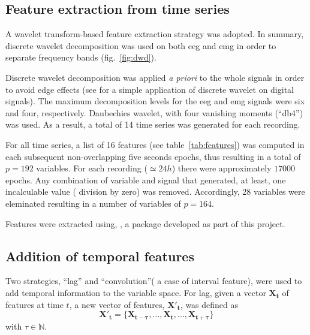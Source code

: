 \subsection{Feature extraction from time series}
\label{sub:features}

A wavelet transform-based feature extraction strategy was adopted.
In summary, discrete wavelet decomposition was used on both \gls{eeg} and \gls{emg}
in order to separate frequency bands (fig.~\ref{fig:dwd}).



Discrete wavelet decomposition was applied \emph{a priori} to the whole signals
in order to avoid edge effects (see \cite{prabhakar_application_2002} for a
simple application of discrete wavelet on digital signals).
The maximum decomposition levels for the \gls{eeg} and \gls{emg} signals were six and four, respectively.
Daubechies wavelet, with four vanishing moments (``db4'') was used.
As a result, a total of 14 time series was generated for each recording.

For all time series, a list of 16 features (see table~\ref{tab:features}) was computed in each subsequent non-overlapping five seconds epochs, 
thus resulting in a total of $p=192$ variables. 
For each recording ($\simeq 24h$) there were approximately $17000$ epochs.
Any combination of variable and signal that generated, at least, one incalculable value (\eg{} division by zero) was removed.
Accordingly, 28 variables were eleminated resulting in a number of variables of $p=164$.



Features were extracted using, \pr{}, a \py{} package developed as part of this project.

\subsection{Addition of temporal features}
Two strategies, ``lag'' and ``convolution''(\ie{} a case of interval feature\cite{rodriguez_support_2005}), were used to add temporal
information to the variable space\cite{dietterich_machine_2002}.
For lag, given a vector $\mathbf{X_t}$ of features at time $t$, a new vector of features, $\mathbf{{X'}_t}$, was defined as
\begin{equation}
\mathbf{{X'}_t} = \{\mathbf{X_{t-\tau}}, ..., \mathbf{X_t}, ..., \mathbf{X_{t+\tau}}\}
\label{eq:tau}
\end{equation}
with $\tau \in \mathbb{N}$.


